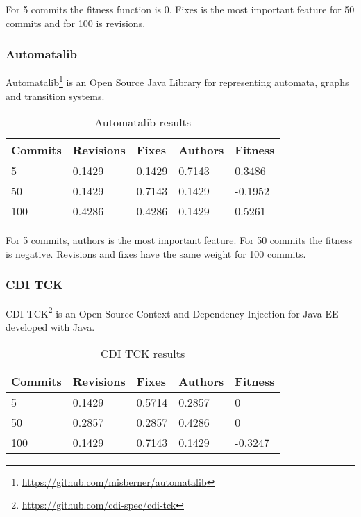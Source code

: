 For 5 commits the fitness function is 0. Fixes is the most important feature for 50 commits and for 100 is revisions.

\subsubsection{Automatalib}
Automatalib\footnote{\url{https://github.com/misberner/automatalib}} is an Open Source Java Library for representing automata, graphs and transition systems.

\begin{table}[H]
    \centering
    \caption{Automatalib results}
    \label{table:learning_automatalib}
    \begin{tabular}{|l|l|l|l|l|}
        \hline
        Commits & Revisions & Fixes & Authors & Fitness \\ \hline
        5         & 0.1429     & 0.1429 & 0.7143   & 0.3486 \\ \hline
        50        & 0.1429 & 0.7143 & 0.1429   & -0.1952 \\ \hline
        100       & 0.4286     & 0.4286  & 0.1429   & 0.5261 \\ \hline
    \end{tabular}
\end{table}

For 5 commits, authors is the most important feature. For 50 commits the fitness is negative. Revisions and fixes have the same weight for 100 commits.

\subsubsection{CDI TCK}
CDI TCK\footnote{\url{https://github.com/cdi-spec/cdi-tck}} is an Open Source Context and Dependency Injection for Java EE developed with Java.

\begin{table}[H]
    \centering
    \caption{CDI TCK results}
    \label{table:learning_cditck}
    \begin{tabular}{|l|l|l|l|l|}
        \hline
        Commits & Revisions & Fixes & Authors & Fitness \\ \hline
        5         & 0.1429     & 0.5714 & 0.2857   & 0 \\ \hline
        50        & 0.2857 & 0.2857 & 0.4286   & 0 \\ \hline
        100       & 0.1429     & 0.7143  & 0.1429   & -0.3247 \\ \hline
    \end{tabular}
\end{table}

